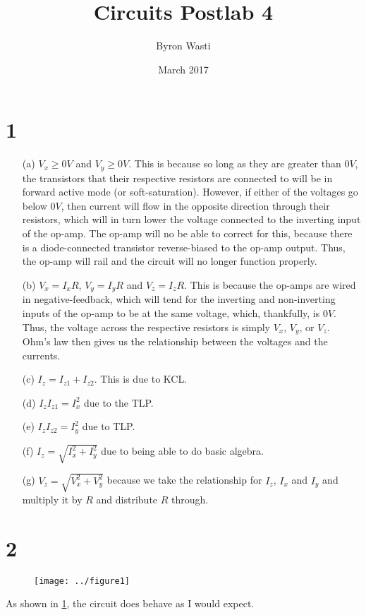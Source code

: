 \documentclass{article}
\title{Circuits Postlab 4}
\author{Byron Wasti}
\date{March 2017}
\begin{document}
\maketitle

\section*{1}
\begin{itemize}
    \item [(a)] $V_x \geq 0V$ and $V_y \geq 0V$. This is because so long as they are greater than $0V$, the transistors that their respective resistors are connected to will be in forward active mode (or soft-saturation). However, if either of the voltages go below $0V$, then current will flow in the opposite direction through their resistors, which will in turn lower the voltage connected to the inverting input of the op-amp. The op-amp will no be able to correct for this, because there is a diode-connected transistor reverse-biased to the op-amp output. Thus, the op-amp will rail and the circuit will no longer function properly.

    \item[(b)] $V_x = I_xR$, $V_y = I_yR$ and $V_z = I_zR$. This is because the op-amps are wired in negative-feedback, which will tend for the inverting and non-inverting inputs of the op-amp to be at the same voltage, which, thankfully, is $0V$. Thus, the voltage across the respective resistors is simply $V_x$, $V_y$, or $V_z$. Ohm's law then gives us the relationship between the voltages and the currents.

    \item[(c)] $I_z = I_{z1} + I_{z2}$. This is due to KCL.
    \item[(d)] $I_zI_{z1} = I_x^2$ due to the TLP.
    \item[(e)] $I_zI_{z2} = I_y^2$ due to TLP.
    \item[(f)] $I_z = \sqrt{ I_x^2 + I_y^2 }$ due to being able to do basic algebra.
    \item[(g)] $V_z = \sqrt{ V_x^2 + V_y^2 }$ because we take the relationship for $I_z$, $I_x$ and $I_y$ and multiply it by $R$ and distribute $R$ through.
\end{itemize}


\section*{2}
\begin{figure}[h]
    \caption{}
    \texttt{[image: ../figure1]}
    \label{fig:1}
\end{figure}

As shown in \ref{fig:1}, the circuit does behave as I would expect.
\end{document}
